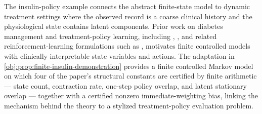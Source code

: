 The insulin-policy example connects the abstract finite-state model to dynamic treatment settings where the observed record is a coarse clinical history and the physiological state contains latent components. Prior work on diabetes management and treatment-policy learning, including \citet{MaahsEtAl2012}, \citet{LuckettEtAl2020}, and related reinforcement-learning formulations such as \citet{NahumShani2018}, motivates finite controlled models with clinically interpretable state variables and actions. The adaptation in \cref{obj:prop:finite-insulin-demonstration} provides a finite controlled Markov model on which four of the paper's structural constants are certified by finite arithmetic --- state count, contraction rate, one-step policy overlap, and latent stationary overlap --- together with a certified nonzero immediate-weighting bias, linking the mechanism behind the theory to a stylized treatment-policy evaluation problem.
